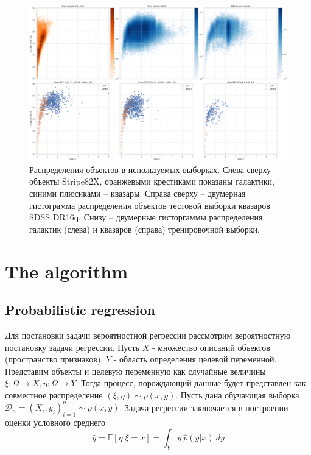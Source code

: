 \documentclass[fleqn,usenatbib]{mnras}
\begin{document}
\begin{figure}
    \centering
    \includegraphics[width=0.95\linewidth]{images/data-dist.png}
    \caption{Распределения объектов в используемых выборках. Слева сверху -- объекты Stripe82X, оранжевыми крестиками показаны галактики, синими плюсиками -- квазары. Справа сверху -- двумерная гистограмма распределения объектов тестовой выборки квазаров SDSS DR16q. Снизу -- двумерные гисторгаммы распределения галактик (слева) и квазаров (справа) тренировочной выборки.}
    \label{fig:data_distribution}
\end{figure}


\section{The algorithm}

\subsection{Probabilistic regression}
Для постановки задачи вероятностной регрессии рассмотрим вероятностную постановку задачи регрессии. Пусть \(X\) - множество описаний объектов (пространство признаков), \(Y\) - область определения целевой переменной. Представим объекты и целевую переменную как случайные величины \(\xi : \Omega \rightarrow X, \eta : \Omega \rightarrow Y \). Тогда процесс, порождающий данные будет представлен как совместное распределение \((\xi, \eta) \sim p(x, y)\). Пусть дана обучающая выборка \(\mathcal{D}_n = (X_i, y_i)_{i=1}^n \sim p(x,y)\). Задача регрессии заключается в построении оценки условного среднего
\begin{equation}\label{eq:regr_classic}
     \hat{y} = \mathbb{E}[\eta | \xi = x] = \int_Y y ~ \hat{p}(y|x) ~ dy
\end{equation}
\end{document}
